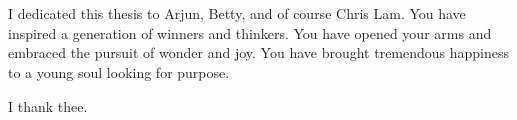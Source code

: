 \cleardoublepage
\chapter*{}
\begin{center}


I dedicated this thesis to Arjun, Betty, and of course Chris Lam.  You have inspired a generation of winners and thinkers.  You have opened your arms and embraced the pursuit of wonder and joy.  You have brought tremendous happiness to a young soul looking for purpose.

I thank thee.
\end{center}
\vspace*{\fill}
\vspace*{\fill}
